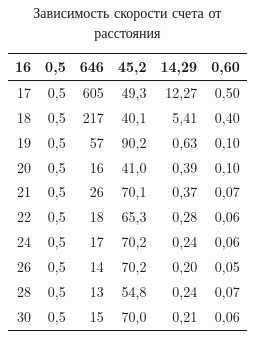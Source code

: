 \begin{enumerate}
\begin{table}[h!]
\begin{tabular}{|r|r|r|r|r|r|}
					16                            & 0,5                                 & 646                        & 45,2                        & 14,29                              & 0,60                                         \\ \hline
					17                            & 0,5                                 & 605                        & 49,3                        & 12,27                              & 0,50                                         \\ \hline
					18                            & 0,5                                 & 217                        & 40,1                        & 5,41                               & 0,40                                         \\ \hline
					19                            & 0,5                                 & 57                         & 90,2                        & 0,63                               & 0,10                                         \\ \hline
					20                            & 0,5                                 & 16                         & 41,0                        & 0,39                               & 0,10                                         \\ \hline
					21                            & 0,5                                 & 26                         & 70,1                        & 0,37                               & 0,07                                        \\ \hline
					22                            & 0,5                                 & 18                         & 65,3                        & 0,28                               & 0,06                                        \\ \hline
					24                            & 0,5                                 & 17                         & 70,2                        & 0,24                               & 0,06                                        \\ \hline
					26                            & 0,5                                 & 14                         & 70,2                        & 0,20                               & 0,05                                        \\ \hline
					28                            & 0,5                                 & 13                         & 54,8                        & 0,24                               & 0,07                                        \\ \hline
					30                            & 0,5                                 & 15                         & 70,0                        & 0,21                               & 0,06                                        \\ \hline
				\end{tabular}
			\caption{Зависимость скорости счета от расстояния}
			\label{AlphaParticles_N(x)}
		\end{table}


\end{enumerate}
